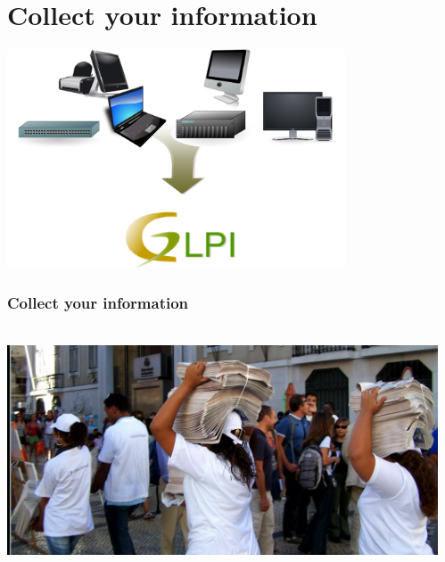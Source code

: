\documentclass{beamer}
\begin{document}
\section{Collect your information}

\begin{frame}
\includegraphics[height=6.5cm]{pics/bigpicture.png}
\end{frame}


\begin{frame}

    \frametitle{Collect your information}

 \begin{columns}
 \begin{column}{0.34\textwidth}
    \includegraphics[height=6.5cm]{pics/information.jpg}
 \end{column}
 \begin{column}{0.90\textwidth}
 \end{column}
\end{columns}


\end{frame}
\end{document}
